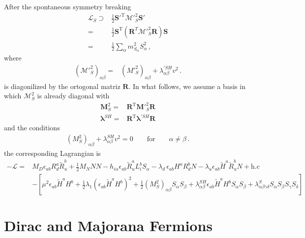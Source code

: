 After the spontaneous symmetry breaking
\begin{align}
  \mathcal{L}_S\supset&\frac{1}{2}{\mathbf{S}'}^{\operatorname{T}}{\boldsymbol{\mathcal{M}}'}_S^2\mathbf{S}' \nonumber\\
=&\frac{1}{2}{\mathbf{S}}^{\operatorname{T}}\left( \mathbf{R}^T{\boldsymbol{\mathcal{M}}'}_S^2\mathbf{R} \right)\mathbf{S} \nonumber\\
=&\frac{1}{2}\sum_{\alpha}m^2_{S_{\alpha}}S_{\alpha}^2\,,
\end{align}
where
\begin{align}
  \left( {\mathcal{M}'}_S ^2\right)_{\alpha\beta}
=&\left( {M'}_S^2 \right)_{\alpha\beta}+\lambda^{\prime SH}_{\alpha\beta}v^2\,.
\end{align}
is diagonilized by the ortogonal matriz $\mathbf{R}$. In what follows, we assume a basis in which $\boldsymbol{\mathcal{M}}_S^2$ is already diagonal with
\begin{align*}
 \mathbf{M}_S^2=&\mathbf{R}^{\operatorname{T}} {\mathbf{M}'}_S^2\mathbf{R} \nonumber\\
\boldsymbol{\lambda}^{SH}=&  \mathbf{R}^{\operatorname{T}}\boldsymbol{\lambda}^{\prime SH} \mathbf{R}
\end{align*}
and  the conditions
\begin{align*}
  \left( {M}_S^2 \right)_{\alpha\beta}+\lambda^{SH}_{\alpha\beta}v^2=0\qquad \text{for} \qquad \alpha\ne\beta\,.
\end{align*}
the corresponding Lagrangian is
\begin{align}
\label{eq:lt13a}
  -\mathcal{L}=&M_D \epsilon_{ab}R^a_d \widetilde{R}^b_u+\tfrac{1}{2}M_N NN-h_{i\alpha} \epsilon_{ab}\widetilde{R}_u^a L_{i}^b S_{\alpha}-\lambda_d\, \epsilon_{ab}H^a R_d^b N-\lambda_u \epsilon_{ab}\widetilde{H}^a \widetilde{R}_u^b N+\text{h.c}\nonumber\\
&-\left[ \mu^2 \epsilon_{ab}\widetilde{H}^{a}H^b+\tfrac{1}{2}\lambda_1 \left( \epsilon_{ab} \widetilde{H}^{a}H^b\right)^2+\tfrac{1}{2}\left({M}_S^2\right)_{\alpha\beta} S_{\alpha}S_\beta
   +\lambda^{SH}_{\alpha\beta} \epsilon_{ab}\widetilde{H}^{a}H^bS_{\alpha}S_{\beta}+\lambda^{S}_{\alpha\beta\gamma\delta}S_{\alpha}S_{\beta}S_{\gamma}S_{\delta}  \right]
\end{align}


\section{Dirac and Majorana Fermions}

